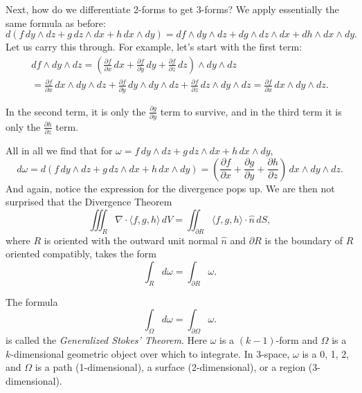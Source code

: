 \documentclass[12pt]{article}
\begin{document}
Next, how do we differentiate 2-forms to get 3-forms?  We apply essentially
the same formula as before:
\[
d(
f\, dy \wedge dz + 
g\, dz \wedge dx +
h\, dx \wedge dy
)
=
df \wedge dy \wedge dz + 
dg \wedge dz \wedge dx +
dh \wedge dx \wedge dy .
\]
Let us carry this through.  For example, let's start with the first
term:
\begin{multline*}
df \wedge dy \wedge dz 
=
\left(
\frac{\partial f}{\partial x} \, dx +
\frac{\partial f}{\partial y} \, dy +
\frac{\partial f}{\partial z} \, dz 
\right)
\wedge dy \wedge dz 
\\
=
\frac{\partial f}{\partial x} \, dx 
\wedge dy \wedge dz +
\frac{\partial f}{\partial y} \, dy 
\wedge dy \wedge dz +
\frac{\partial f}{\partial z} \, dz 
\wedge dy \wedge dz 
=
\frac{\partial f}{\partial x} \, dx \wedge dy \wedge dz .
\end{multline*}

In the second term, it is only the $\frac{\partial g}{\partial y}$ term to
survive, and in the third term it is only the
$\frac{\partial h}{\partial z}$ term.

All in all we find
that for
$\omega = f\, dy \wedge dz + 
g\, dz \wedge dx +
h\, dx \wedge dy$,
\begin{equation*}
d\omega =
d(
f\, dy \wedge dz + 
g\, dz \wedge dx +
h\, dx \wedge dy
)
=
\left(\frac{\partial f}{\partial x} +
\frac{\partial g}{\partial y} +
\frac{\partial h}{\partial z} \right) \, dx \wedge dy \wedge dz .
\end{equation*}
And again, notice the expression for the divergence pops up.
We are then not surprised that the Divergence Theorem
\begin{equation*}
\iiint_R \nabla \cdot \langle f,g,h \rangle \, dV = \iint_{\partial R}
\langle f,g,h \rangle \cdot
\hat{n} \, dS,
\end{equation*}
where $R$ is oriented with the outward unit normal $\hat{n}$
and
$\partial R$ is the boundary of $R$ oriented compatibly,
takes the form
\begin{equation*}
\int_R d \omega = \int_{\partial R} \omega .
\end{equation*}

The formula
\begin{equation*}
\int_\Omega d \omega = \int_{\partial \Omega} \omega .
\end{equation*}
is called the \emph{Generalized Stokes' Theorem}.  Here $\omega$ is a
$(k-1)$-form and $\Omega$ is a $k$-dimensional geometric object over which to
integrate.  In 3-space, $\omega$ is a 0, 1, 2, and
$\Omega$ is a path (1-dimensional), a surface
(2-dimensional), or a region (3-dimensional).
\end{document}
